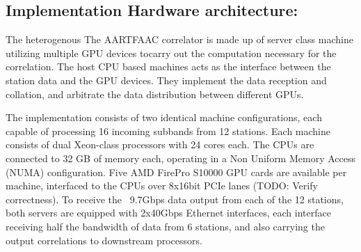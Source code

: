 \documentclass{ws-jai}
\begin{document}
\subsection  {Implementation  Hardware  architecture:} 
The heterogenous  The AARTFAAC  correlator is  made up  of server  class machine
utilizing multiple  GPU devices  tocarry out the  computation necessary  for the
correlation.  The  host CPU  based machines  acts as  the interface  between the
station data and the GPU devices.  They  implement the data reception and collation, and arbitrate
the data distribution between different GPUs. 







The  implementation  consists  of  two identical  machine  configurations,  each
capable  of processing  16  incoming  subbands from  12  stations. Each  machine
consists  of  dual Xeon-class  processors  with  24  cores  each. The  CPUs  are
connected to  32 GB  of memory each,  operating in a  Non Uniform  Memory Access
(NUMA)  configuration. Five  AMD  FirePro  S10000 GPU  cards  are available  per
machine,  interfaced  to  the  CPUs   over  8x16bit  PCIe  lanes  (TODO:  Verify
correctness). To receive the ~9.7Gbps data  output from each of the 12 stations,
both  servers are  equipped with  2x40Gbps Ethernet  interfaces, each  interface
receiving half  the bandwidth  of data  from 6 stations,  and also  carrying the
output correlations to downstream processors.\\
\end{document}
